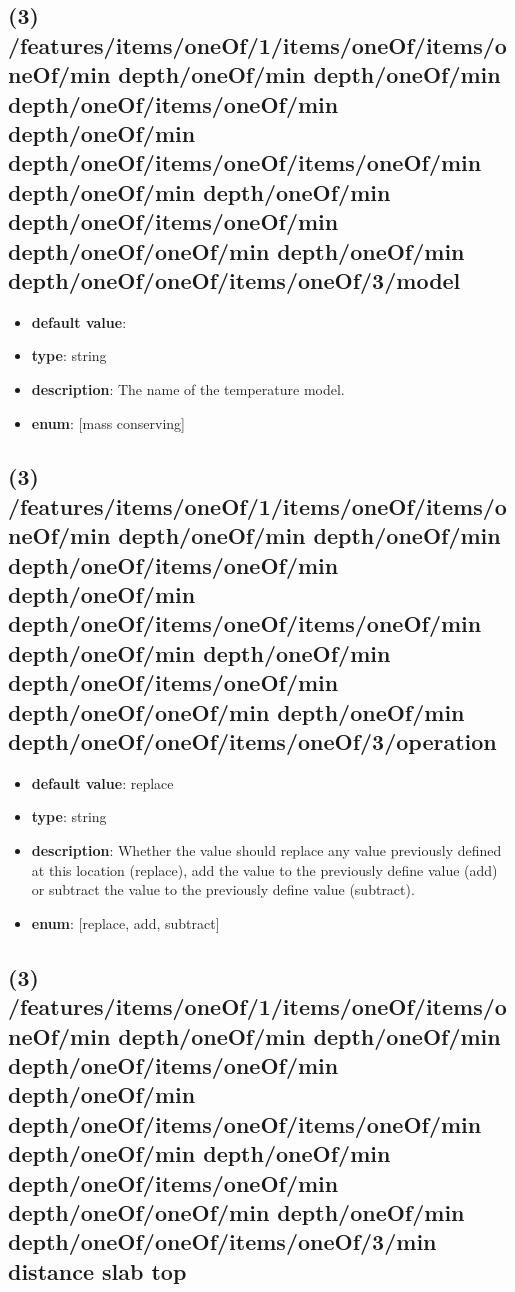 \subsection{(3) /features/items/oneOf/1/items/oneOf/items/oneOf/min depth/oneOf/min depth/oneOf/min depth/oneOf/items/oneOf/min depth/oneOf/min depth/oneOf/items/oneOf/items/oneOf/min depth/oneOf/min depth/oneOf/min depth/oneOf/items/oneOf/min depth/oneOf/oneOf/min depth/oneOf/min depth/oneOf/oneOf/items/oneOf/3/model}
\begin{itemize}[leftmargin=3em]\item {\bf default value}: 
\item {\bf type}: string
\item {\bf description}: The name of the temperature model.
\item {\bf enum}: [mass conserving]\end{itemize}\subsection{(3) /features/items/oneOf/1/items/oneOf/items/oneOf/min depth/oneOf/min depth/oneOf/min depth/oneOf/items/oneOf/min depth/oneOf/min depth/oneOf/items/oneOf/items/oneOf/min depth/oneOf/min depth/oneOf/min depth/oneOf/items/oneOf/min depth/oneOf/oneOf/min depth/oneOf/min depth/oneOf/oneOf/items/oneOf/3/operation}
\begin{itemize}[leftmargin=3em]\item {\bf default value}: replace
\item {\bf type}: string
\item {\bf description}: Whether the value should replace any value previously defined at this location (replace), add the value to the previously define value (add) or subtract the value to the previously define value (subtract).
\item {\bf enum}: [replace, add, subtract]\end{itemize}\subsection{(3) /features/items/oneOf/1/items/oneOf/items/oneOf/min depth/oneOf/min depth/oneOf/min depth/oneOf/items/oneOf/min depth/oneOf/min depth/oneOf/items/oneOf/items/oneOf/min depth/oneOf/min depth/oneOf/min depth/oneOf/items/oneOf/min depth/oneOf/oneOf/min depth/oneOf/min depth/oneOf/oneOf/items/oneOf/3/min distance slab top}
